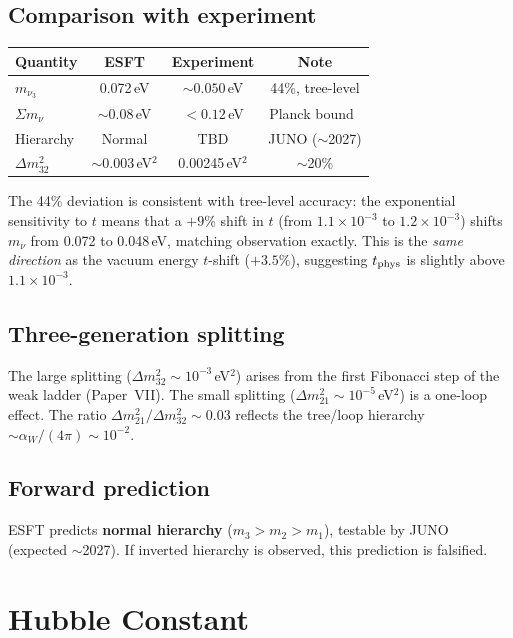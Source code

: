 \documentclass[twocolumn,preprintnumbers,amsmath,amssymb,prd]{revtex4-2}
\begin{document}
\subsection{Comparison with experiment}

\begin{center}
\begin{tabular}{lccc}
\toprule
Quantity & ESFT & Experiment & Note \\
\midrule
$m_{\nu_3}$ & 0.072\,eV & $\sim 0.050$\,eV & 44\%, tree-level \\
$\Sigma m_\nu$ & $\sim 0.08$\,eV & $< 0.12$\,eV & Planck bound~\cite{Planck2020} \\
Hierarchy & Normal & TBD & JUNO ($\sim$2027) \\
$\Delta m^2_{32}$ & $\sim 0.003\,$eV$^2$ & 0.00245\,eV$^2$ & $\sim$20\% \\
\bottomrule
\end{tabular}
\end{center}

The 44\% deviation is consistent with tree-level accuracy: the exponential sensitivity to $t$ means that a $+9\%$ shift in $t$ (from $1.1\times10^{-3}$ to $1.2\times10^{-3}$) shifts $m_\nu$ from 0.072 to 0.048\,eV, matching observation exactly.
This is the \emph{same direction} as the vacuum energy $t$-shift ($+3.5\%$), suggesting $t_{\rm phys}$ is slightly above $1.1\times10^{-3}$.

\subsection{Three-generation splitting}

The large splitting ($\Delta m^2_{32} \sim 10^{-3}\,$eV$^2$) arises from the first Fibonacci step of the weak ladder (Paper~VII).
The small splitting ($\Delta m^2_{21} \sim 10^{-5}\,$eV$^2$) is a one-loop effect.
The ratio $\Delta m^2_{21}/\Delta m^2_{32} \sim 0.03$ reflects the tree/loop hierarchy $\sim \alpha_W/(4\pi) \sim 10^{-2}$.

\subsection{Forward prediction}

ESFT predicts \textbf{normal hierarchy} ($m_3 > m_2 > m_1$), testable by JUNO (expected $\sim$2027).
If inverted hierarchy is observed, this prediction is falsified.

\section{Hubble Constant}
\label{sec:hubble}
\end{document}
